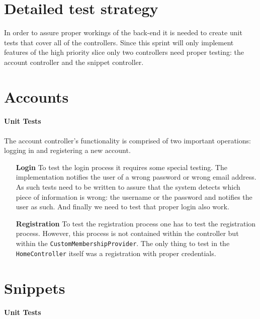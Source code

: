 \documentclass[10pt,a4paper,BCOR12mm, headexclude, footexclude,
  twoside, openright]{scrartcl}
\numberwithin{equation}{section} %
\numberwithin{figure}{section} %
\numberwithin{table}{section} %
\begin{document}
\pagestyle{plain}

\section{Detailed test strategy}
In order to assure proper workings of the back-end it is needed to create unit
tests that cover all of the controllers. Since this sprint will only implement
features of the high priority slice only two controllers need proper testing:
the account controller and the snippet controller.

\section{Accounts}

\paragraph{Unit Tests}

The account controller's functionality is comprised of two important operations:
logging in and registering a new account.

\begin{itemize}
\item[\textbf{Login}]To test the login process it requires some special
  testing. The implementation notifies the user of a wrong password or wrong
  email address. As such tests need to be written to assure that the system
  detects which piece of information is wrong: the username or the password and
  notifies the user as such. And finally we need to test that proper login also
  work.
\item[\textbf{Registration}] To test the registration process one has to test
  the registration process. However, this process is not contained within the
  controller but within the \texttt{Custom\-Member\-ship\-Provider}. The only
  thing to test in the \texttt{HomeController} itself was a registration with
  proper credentials.
\end{itemize}



\section{Snippets}
\paragraph{Unit Tests}
\end{document}
